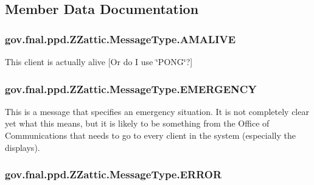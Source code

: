\subsection{Member Data Documentation}
\hypertarget{enumgov_1_1fnal_1_1ppd_1_1ZZattic_1_1MessageType_a420f0982959f71b7899e7edee8625e43}{
\subsubsection[{A\-M\-A\-L\-I\-V\-E}]{\setlength{\rightskip}{0pt plus 5cm}gov.\-fnal.\-ppd.\-Z\-Zattic.\-Message\-Type.\-A\-M\-A\-L\-I\-V\-E}}\label{enumgov_1_1fnal_1_1ppd_1_1ZZattic_1_1MessageType_a420f0982959f71b7899e7edee8625e43}
This client is actually alive \mbox{[}Or do I use \char`\"{}\-P\-O\-N\-G\char`\"{}?\mbox{]} \hypertarget{enumgov_1_1fnal_1_1ppd_1_1ZZattic_1_1MessageType_a8a6cc8f8eed3c874f5bdf50a2d257d99}{
\subsubsection[{E\-M\-E\-R\-G\-E\-N\-C\-Y}]{\setlength{\rightskip}{0pt plus 5cm}gov.\-fnal.\-ppd.\-Z\-Zattic.\-Message\-Type.\-E\-M\-E\-R\-G\-E\-N\-C\-Y}}\label{enumgov_1_1fnal_1_1ppd_1_1ZZattic_1_1MessageType_a8a6cc8f8eed3c874f5bdf50a2d257d99}
This is a message that specifies an emergency situation. It is not completely clear yet what this means, but it is likely to be something from the Office of Communications that needs to go to every client in the system (especially the displays). \hypertarget{enumgov_1_1fnal_1_1ppd_1_1ZZattic_1_1MessageType_a367c7f63789c3a45808b4ddbd7fa28c6}{
\subsubsection[{E\-R\-R\-O\-R}]{\setlength{\rightskip}{0pt plus 5cm}gov.\-fnal.\-ppd.\-Z\-Zattic.\-Message\-Type.\-E\-R\-R\-O\-R}}\label{enumgov_1_1fnal_1_1ppd_1_1ZZattic_1_1MessageType_a367c7f63789c3a45808b4ddbd7fa28c6}

